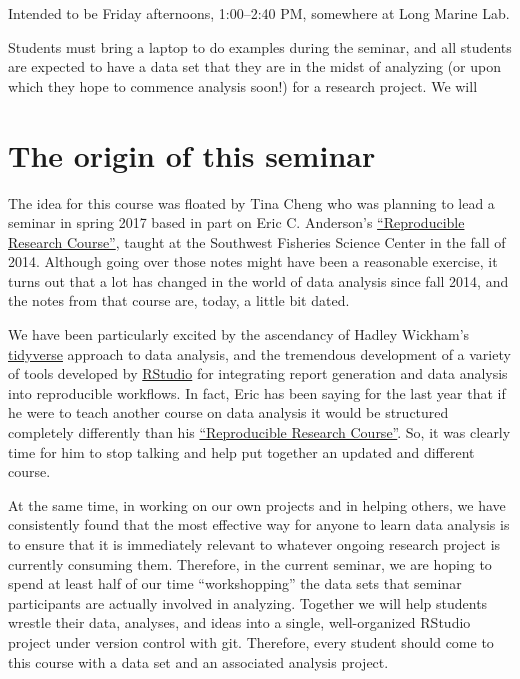 \documentclass[]{book}
\theoremstyle{definition}
\theoremstyle{definition}
\theoremstyle{remark}
\begin{document}
Intended to be Friday afternoons, 1:00--2:40 PM, somewhere at Long
Marine Lab.

Students must bring a laptop to do examples during the seminar, and all
students are expected to have a data set that they are in the midst of
analyzing (or upon which they hope to commence analysis soon!) for a
research project. We will

\section{The origin of this seminar}\label{the-origin-of-this-seminar}

The idea for this course was floated by Tina Cheng who was planning to
lead a seminar in spring 2017 based in part on Eric C. Anderson's
\href{http://eriqande.github.io/rep-res-web/}{``Reproducible Research
Course''}, taught at the Southwest Fisheries Science Center in the fall
of 2014. Although going over those notes might have been a reasonable
exercise, it turns out that a lot has changed in the world of data
analysis since fall 2014, and the notes from that course are, today, a
little bit dated.

We have been particularly excited by the ascendancy of Hadley Wickham's
\href{http://tidyverse.org/}{tidyverse} approach to data analysis, and
the tremendous development of a variety of tools developed by
\href{https://www.rstudio.com/}{RStudio} for integrating report
generation and data analysis into reproducible workflows. In fact, Eric
has been saying for the last year that if he were to teach another
course on data analysis it would be structured completely differently
than his \href{http://eriqande.github.io/rep-res-web/}{``Reproducible
Research Course''}. So, it was clearly time for him to stop talking and
help put together an updated and different course.

At the same time, in working on our own projects and in helping others,
we have consistently found that the most effective way for anyone to
learn data analysis is to ensure that it is immediately relevant to
whatever ongoing research project is currently consuming them.
Therefore, in the current seminar, we are hoping to spend at least half
of our time ``workshopping'' the data sets that seminar participants are
actually involved in analyzing. Together we will help students wrestle
their data, analyses, and ideas into a single, well-organized RStudio
project under version control with git. Therefore, every student should
come to this course with a data set and an associated analysis project.
\end{document}
